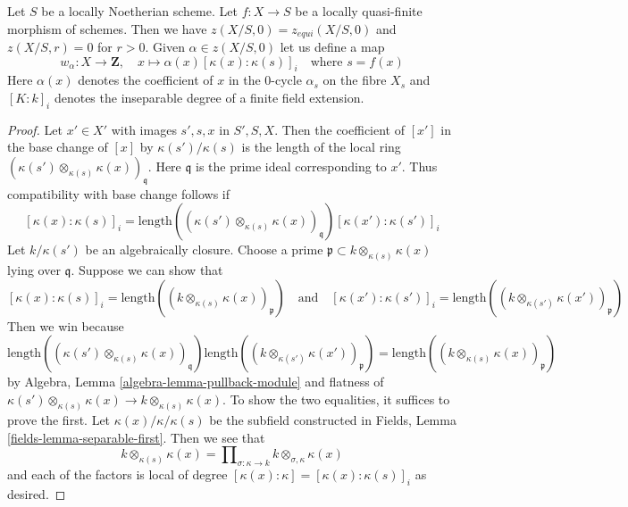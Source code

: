 \documentclass{stacks-project}
\theoremstyle{plain}
\theoremstyle{definition}
\theoremstyle{remark}
\numberwithin{equation}{subsection}
\begin{document}
\medskip\noindent
Let $S$ be a locally Noetherian scheme. Let $f : X \to S$ be a locally
quasi-finite morphism of schemes. Then we have $z(X/S, 0) = z_{equi}(X/S, 0)$
and $z(X/S, r) = 0$ for $r > 0$. Given $\alpha \in z(X/S, 0)$ let us
define a map
$$
w_\alpha : X \longrightarrow \mathbf{Z},\quad
x \mapsto \alpha(x) [\kappa(x) : \kappa(s)]_i \quad\text{where }s = f(x)
$$
Here $\alpha(x)$ denotes the coefficient of $x$ in the $0$-cycle
$\alpha_s$ on the fibre $X_s$ and $[K : k]_i$ denotes the inseparable
degree of a finite field extension.

\begin{proof}
Let $x' \in X'$ with images $s', s, x$ in $S', S, X$.
Then the coefficient of $[x']$ in
the base change of $[x]$ by $\kappa(s')/\kappa(s)$ is the length of
the local ring $(\kappa(s') \otimes_{\kappa(s)} \kappa(x))_\mathfrak q$.
Here $\mathfrak q$ is the prime ideal corresponding to $x'$.
Thus compatibility with base change follows if
$$
[\kappa(x) : \kappa(s)]_i =
\text{length}((\kappa(s') \otimes_{\kappa(s)} \kappa(x))_\mathfrak q)
[\kappa(x') : \kappa(s')]_i
$$
Let $k/\kappa(s')$ be an algebraically closure. Choose a prime
$\mathfrak p \subset k \otimes_{\kappa(s)} \kappa(x)$ lying
over $\mathfrak q$. Suppose we can show that
$$
[\kappa(x) : \kappa(s)]_i =
\text{length}((k \otimes_{\kappa(s)} \kappa(x))_\mathfrak p)
\quad\text{and}\quad
[\kappa(x') : \kappa(s')]_i =
\text{length}((k \otimes_{\kappa(s')} \kappa(x'))_\mathfrak p)
$$
Then we win because
$$
\text{length}((\kappa(s') \otimes_{\kappa(s)} \kappa(x))_\mathfrak q)
\text{length}((k \otimes_{\kappa(s')} \kappa(x'))_\mathfrak p)
=
\text{length}((k \otimes_{\kappa(s)} \kappa(x))_\mathfrak p)
$$
by Algebra, Lemma \ref{algebra-lemma-pullback-module} and flatness of
$\kappa(s') \otimes_{\kappa(s)} \kappa(x) \to k \otimes_{\kappa(s)} \kappa(x)$.
To show the two equalities, it suffices to prove the first.
Let $\kappa(x)/\kappa/\kappa(s)$ be the subfield constructed in
Fields, Lemma \ref{fields-lemma-separable-first}. Then we see that
$$
k \otimes_{\kappa(s)} \kappa(x) =
\prod\nolimits_{\sigma : \kappa \to k}
k \otimes_{\sigma, \kappa} \kappa(x)
$$
and each of the factors is local of degree
$[\kappa(x) : \kappa] = [\kappa(x) : \kappa(s)]_i$
as desired.
\end{proof}
\end{document}
